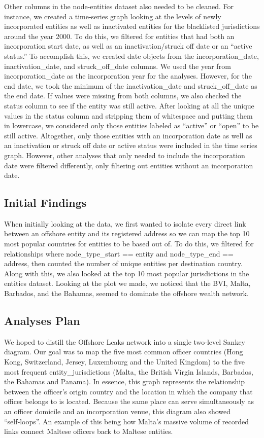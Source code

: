 \documentclass{article}
\begin{document}
Other columns in the node-entities dataset also needed to be cleaned. For instance, we created a time-series graph looking at the levels of newly incorporated entities as well as inactivated entities for the blacklisted jurisdictions around the year 2000. To do this, we filtered for entities that had both an incorporation start date, as well as an inactivation/struck off date or an “active status.” To accomplish this, we created date objects from the incorporation\_date, inactivation\_date, and struck\_off\_date columns. We used the year from incorporation\_date as the incorporation year for the analyses. However, for the end date, we took the minimum of the inactivation\_date and struck\_off\_date as the end date. If values were missing from both columns, we also checked the status column to see if the entity was still active. After looking at all the unique values in the status column and stripping them of whitespace and putting them in lowercase, we considered only those entities labeled as “active” or “open” to be still active. Altogether, only those entities with an incorporation date as well as an inactivation or struck off date or active status were included in the time series graph. However, other analyses that only needed to include the incorporation date were filtered differently, only filtering out entities without an incorporation date.

\subsection{Initial Findings}
When initially looking at the data, we first wanted to isolate every direct link between an offshore entity and its registered address so we can map the top 10 most popular countries for entities to be based out of. 
To do this, we filtered for relationships where node\_type\_start == entity and node\_type\_end == address, then counted the number of unique entities per destination country. Along with this, we also looked at the top 10 most popular jurisdictions in the entities dataset. Looking at the plot we made, we noticed that the BVI, Malta, Barbados, and the Bahamas, seemed to dominate the offshore wealth network.

\subsection{Analyses Plan}
We hoped to distill the Offshore Leaks network into a single two‑level Sankey diagram. Our goal was to map the five most common officer countries (Hong Kong, Switzerland, Jersey, Luxembourg and the United Kingdom) to the five most frequent entity\_jurisdictions (Malta, the British Virgin Islands, Barbados, the Bahamas and Panama). In essence, this graph represents the relationship between the officer’s origin country and the location in which the company that officer belongs to is located. Because the same place can serve simultaneously as an officer domicile and an incorporation venue, this diagram also showed “self‑loops”. An example of this being how Malta’s massive volume of recorded links connect Maltese officers back to Maltese entities.
\end{document}
